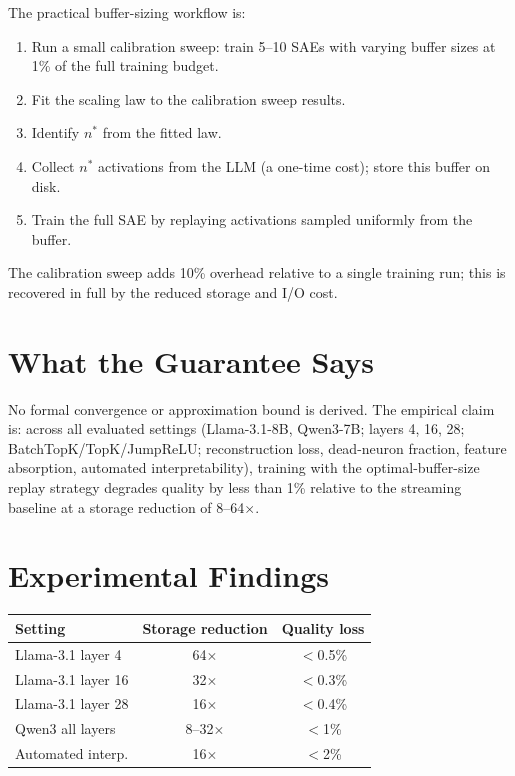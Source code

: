 \documentclass[10pt,twocolumn]{article}
\begin{document}
The practical buffer-sizing workflow is:
\begin{enumerate}[itemsep=2pt,parsep=0pt]
  \item Run a small calibration sweep: train 5--10 SAEs with varying buffer sizes
    at 1\% of the full training budget.
  \item Fit the scaling law to the calibration sweep results.
  \item Identify $n^*$ from the fitted law.
  \item Collect $n^*$ activations from the LLM (a one-time cost); store this
    buffer on disk.
  \item Train the full SAE by replaying activations sampled uniformly from the
    buffer.
\end{enumerate}
The calibration sweep adds 10\% overhead relative to a single training run;
this is recovered in full by the reduced storage and I/O cost.

\section{What the Guarantee Says}

No formal convergence or approximation bound is derived. The empirical claim is:
across all evaluated settings (Llama-3.1-8B, Qwen3-7B; layers 4, 16, 28;
BatchTopK/TopK/JumpReLU; reconstruction loss, dead-neuron fraction, feature
absorption, automated interpretability), training with the optimal-buffer-size
replay strategy degrades quality by less than 1\% relative to the streaming
baseline at a storage reduction of 8--64$\times$.

\section{Experimental Findings}

\begin{table}[h!]
\centering\small
\begin{tabular}{lcc}
\toprule
Setting & Storage reduction & Quality loss \\
\midrule
Llama-3.1 layer 4 & 64$\times$ & $<$0.5\% \\
Llama-3.1 layer 16 & 32$\times$ & $<$0.3\% \\
Llama-3.1 layer 28 & 16$\times$ & $<$0.4\% \\
Qwen3 all layers & 8--32$\times$ & $<$1\% \\
Automated interp. & 16$\times$ & $<$2\% \\
\bottomrule
\end{tabular}
\end{table}
\end{document}
